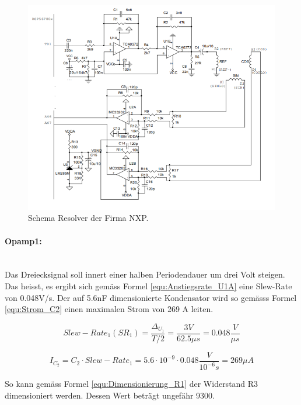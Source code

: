 \begin{figure}[h!]
	\centering
	\includegraphics[width=\textwidth]{graphics/Schema_Resolver.png}
	\caption{Schema Resolver der Firma NXP.\cite{mienkina_56f80x_nodate}}
	\label{fig:Schaltung_Resolver_NXP}
\end{figure}

\paragraph{Opamp1:}\mbox{}\\

Das Dreiecksignal soll innert einer halben Periodendauer um drei Volt steigen. Das heisst, es ergibt sich gemäss Formel \ref{equ:Anstiegsrate_U1A} eine Slew-Rate von 0.048V/\textmu s.
Der auf 5.6nF dimensionierte Kondensator wird so gemässs Formel \ref{equ:Strom_C2} einen maximalen Strom von 269 \textmu A leiten. \cite{user_gast_berechnung_2009}

\begin{equation}
Slew-Rate_1 (SR_1) = \frac{\Delta_{U_1}}{T/2} = \frac{3V}{62.5 \mu s} = 0.048\frac{V}{\mu s}
\label{equ:Anstiegsrate_U1A}
\end{equation}

\begin{equation}
I_{C_2} = C_2 \cdot Slew-Rate_1 = 5.6 \cdot 10^{-9} \cdot 0.048\frac{V}{10^{-6}s} = 269\mu A
\label{equ:Strom_C2}
\end{equation}

So kann gemäss Formel \ref{equ:Dimensionierung_R1} der Widerstand R3 dimensioniert werden. Dessen Wert beträgt ungefähr 9300\textOmega. \cite{user_gast_berechnung_2009}

